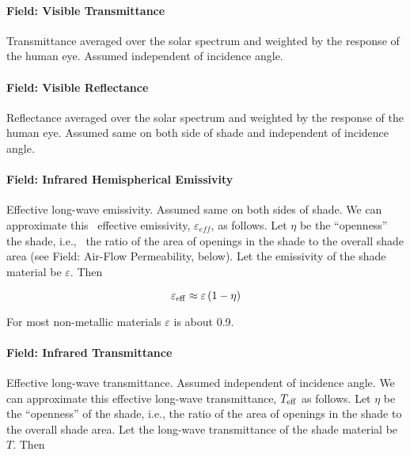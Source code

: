 \paragraph{Field: Visible Transmittance}\label{field-visible-transmittance-1}

Transmittance averaged over the solar spectrum and weighted by the response of the human eye. Assumed independent of incidence angle.

\paragraph{Field: Visible Reflectance}\label{field-visible-reflectance}

Reflectance averaged over the solar spectrum and weighted by the response of the human eye. Assumed same on both side of shade and independent of incidence angle.

\paragraph{Field: Infrared Hemispherical Emissivity}\label{field-infrared-hemispherical-emissivity-201710020805}

Effective long-wave emissivity. Assumed same on both sides of shade. We can approximate this~ effective emissivity, \(\varepsilon_{eff}\), as follows. Let \(\eta\) be the ``openness'' the shade, i.e.,~ the ratio of the area of openings in the shade to the overall shade area (see Field: Air-Flow Permeability, below). Let the emissivity of the shade material be \(\varepsilon\). Then

\begin{equation}
{\varepsilon_{{\rm{eff}}}} \approx \varepsilon \left( {1 - \eta } \right)
\end{equation}

For most non-metallic materials \(\varepsilon\) is about 0.9.

\paragraph{Field: Infrared Transmittance}\label{field-infrared-transmittance}

Effective long-wave transmittance. Assumed independent of incidence angle. We can approximate this effective long-wave transmittance, \(T_{\rm{eff}}\) as follows. Let \(\eta\) be the ``openness'' of the shade, i.e., the ratio of the area of openings in the shade to the overall shade area. Let the long-wave transmittance of the shade material be \(T\). Then

